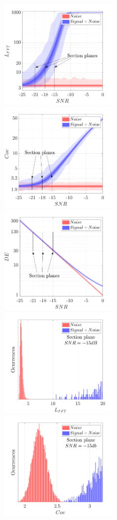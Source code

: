 \documentclass[lettersize,journal]{IEEEtran}
\begin{document}
\begin{figure}
    \center
    \includegraphics[width = 2.3in]{LvsSNR.png}
    \includegraphics[width = 2.3in]{CovvsSNR.png}
    \includegraphics[width = 2.3in]{EvsSNR.png}\\
    \includegraphics[width = 2.3in]{histL-15db.png}
    \includegraphics[width = 2.3in]{histCov-15db.png}

\end{figure}
\end{document}
